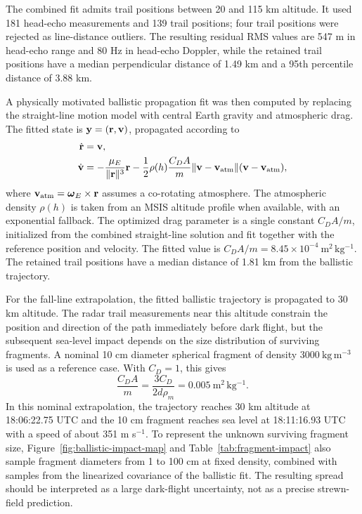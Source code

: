 The combined fit admits trail positions between 20 and 115 km altitude.  It
used 181 head-echo measurements and 139 trail positions; four trail positions
were rejected as line-distance outliers.  The resulting residual RMS values are
547 m in head-echo range and 80 Hz in head-echo Doppler, while the retained
trail positions have a median perpendicular distance of 1.49 km and a 95th
percentile distance of 3.88 km.

A physically motivated ballistic propagation fit was then computed by replacing
the straight-line motion model with central Earth gravity and atmospheric drag.
The fitted state is \({\bf y}=({\bf r},{\bf v})\), propagated according to
\[
  \begin{aligned}
    \dot{\bf r} &= {\bf v},\\
    \dot{\bf v} &=
      -\frac{\mu_E}{\|{\bf r}\|^3}{\bf r}
      -\frac{1}{2}\rho(h)\frac{C_D A}{m}
      \|{\bf v}-{\bf v}_{\mathrm{atm}}\|
      ({\bf v}-{\bf v}_{\mathrm{atm}}),
  \end{aligned}
\]
where \({\bf v}_{\mathrm{atm}}={\boldsymbol\omega}_E\times{\bf r}\) assumes a
co-rotating atmosphere.  The atmospheric density \(\rho(h)\) is taken from an
MSIS altitude profile when available, with an exponential fallback.  The
optimized drag parameter is a single constant \(C_D A/m\), initialized from the
combined straight-line solution and fit together with the reference position
and velocity.  The fitted value is
\(C_D A/m = 8.45\times10^{-4}\ \mathrm{m^2\,kg^{-1}}\).  The retained trail
positions have a median distance of 1.81 km from the ballistic trajectory.

For the fall-line extrapolation, the fitted ballistic trajectory is propagated
to 30 km altitude.  The radar trail measurements near this altitude constrain
the position and direction of the path immediately before dark flight, but the
subsequent sea-level impact depends on the size distribution of surviving
fragments.  A nominal 10 cm diameter spherical fragment of density
\(3000\ \mathrm{kg\,m^{-3}}\) is used as a reference case.  With \(C_D=1\), this
gives
\[
  \frac{C_D A}{m}
  =
  \frac{3C_D}{2d\rho_m}
  =
  0.005\ \mathrm{m^2\,kg^{-1}} .
\]
In this nominal extrapolation, the trajectory reaches 30 km altitude at
18:06:22.75 UTC and the 10 cm fragment reaches sea level at 18:11:16.93 UTC
with a speed of about 351 m s\(^{-1}\).  To represent the unknown surviving
fragment size, Figure~\ref{fig:ballistic-impact-map} and
Table~\ref{tab:fragment-impact} also sample fragment diameters from 1 to
100 cm at fixed density, combined with samples from the linearized covariance
of the ballistic fit.  The resulting spread should be interpreted as a large
dark-flight uncertainty, not as a precise strewn-field prediction.


